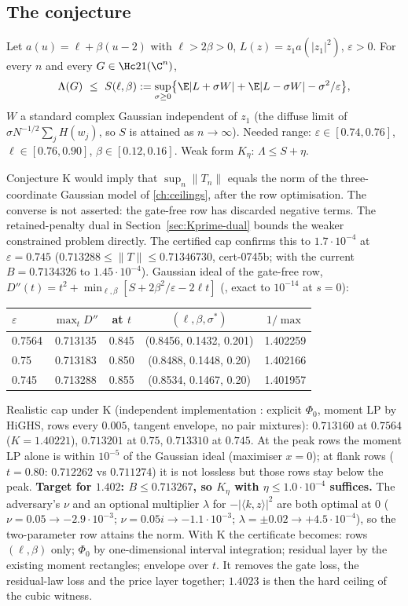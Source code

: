 \subsection{The conjecture}
\begin{conjecture}\label{conj:K}
Let $a(u)=\ell+\beta(u-2)$ with $\ell>2\beta>0$, $L(z)=z_1a(|z_1|^2)$, $\varepsilon>0$. For every $n$ and every $G\in\Hc21(\C^n)$,
\[
\Lambda(G)\ \le\ S(\ell,\beta):=\sup_{\sigma\ge0}\bigl\{\E|L+\sigma W|+\E|L-\sigma W|-\sigma^2/\varepsilon\bigr\},
\]
$W$ a standard complex Gaussian independent of $z_1$ (the diffuse limit of $\sigma N^{-1/2}\sum_jH(w_j)$, so $S$ is attained as $n\to\infty$).
Needed range: $\varepsilon\in[0.74,0.76]$, $\ell\in[0.76,0.90]$, $\beta\in[0.12,0.16]$. Weak form $K_\eta$: $\Lambda\le S+\eta$.
\end{conjecture}
Conjecture K would imply that $\sup_n\|T_n\|$ equals the norm of the three-coordinate Gaussian model of \autoref{ch:ceilings}, after the row optimisation. The converse is not asserted: the gate-free row has discarded negative terms. The retained-penalty dual in Section~\ref{sec:Kprime-dual} bounds the weaker constrained problem directly. The certified cap confirms this
to $1.7\cdot10^{-4}$ at $\varepsilon=0.745$ ($0.713288\le\|T\|\le0.71346730$, cert-0745b; with the current $B=0.7134326$ to $1.45\cdot10^{-4}$). Gaussian ideal of the gate-free row, $D''(t)=t^2+\min_{\ell,\beta}[S+2\beta^2/\varepsilon-2\ell t]$
(, exact to $10^{-14}$ at $s=0$):
\begin{center}
\begin{tabular}{lcccc}\toprule
$\varepsilon$ & $\max_tD''$ & at $t$ & $(\ell,\beta,\sigma^*)$ & $1/\max$\\\midrule
0.7564 & 0.713135 & 0.845 & (0.8456, 0.1432, 0.201) & 1.402259\\
0.75 & 0.713183 & 0.850 & (0.8488, 0.1448, 0.20) & 1.402166\\
0.745 & 0.713288 & 0.855 & (0.8534, 0.1467, 0.20) & 1.401957\\\bottomrule
\end{tabular}
\end{center}
Realistic cap under K (independent implementation : explicit $\Phi_0$, moment LP by HiGHS, rows every $0.005$, tangent envelope, no pair
mixtures): $0.713160$ at $0.7564$ ($K=1.40221$), $0.713201$ at $0.75$, $0.713310$ at $0.745$. At the peak rows the moment LP alone is within $10^{-5}$ of the
Gaussian ideal (maximiser $x=0$); at flank rows ($t=0.80$: $0.712262$ vs $0.711274$) it is not lossless but those rows stay below the peak. \textbf{Target
for $1.402$: $B\le0.713267$, so $K_\eta$ with $\eta\le1.0\cdot10^{-4}$ suffices.} The adversary's $\nu$ and an optional multiplier $\lambda$ for $-|\langle k,z\rangle|^2$
are both optimal at $0$ ($\nu=0.05\to-2.9\cdot10^{-3}$; $\nu=0.05i\to-1.1\cdot10^{-3}$; $\lambda=\pm0.02\to+4.5\cdot10^{-4}$), so the two-parameter row attains the norm.
With K the certificate becomes: rows $(\ell,\beta)$ only; $\Phi_0$ by one-dimensional interval integration; residual layer by the existing moment
rectangles; envelope over $t$. It removes the gate loss, the residual-law loss and the price layer together; $1.4023$ is then the hard ceiling of the cubic
witness.

